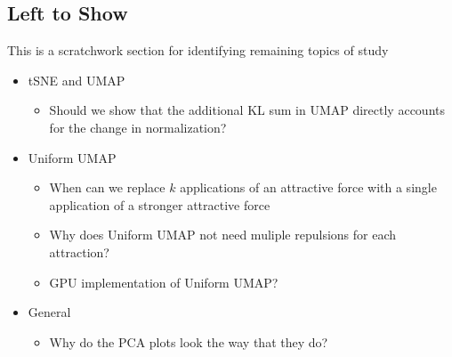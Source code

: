 \documentclass{article}
\theoremstyle{definition}
\begin{document}
\begin{multicols}{2}
\section{Left to Show}
This is a scratchwork section for identifying remaining topics of study
\begin{itemize}
    \item tSNE and UMAP
        \begin{itemize}
            \item Should we show that the additional KL sum in UMAP directly accounts for the change in normalization?
        \end{itemize}
    \item Uniform UMAP
        \begin{itemize}
            \item When can we replace $k$ applications of an attractive force with a single application of a stronger attractive force
            \item Why does Uniform UMAP not need muliple repulsions for each attraction?
            \item GPU implementation of Uniform UMAP?
        \end{itemize}
    \item General
        \begin{itemize}
            \item Why do the PCA plots look the way that they do?
        \end{itemize}
\end{itemize}

\end{multicols}
\printbibliography
\end{document}
